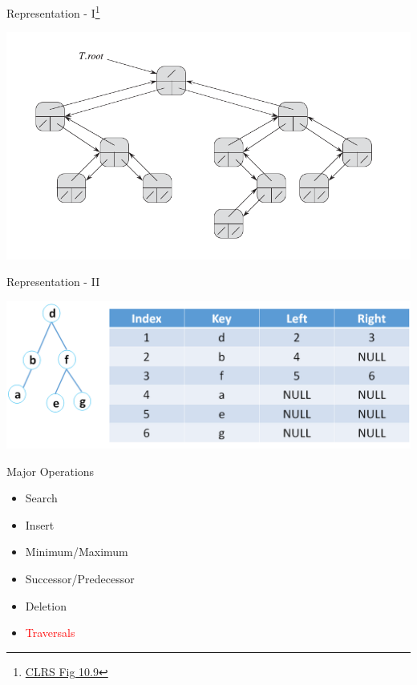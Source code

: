 \documentclass{beamer}
\newcommand{\hred}[1]{{\textcolor{red}{#1}}}
\newcommand{\furl}[1]{{\footnote{\url{#1}}}}
\begin{document}
\begin{frame}{Representation - I\furl{CLRS Fig 10.9}}
    \begin{center}
        \includegraphics[scale=0.4]{bstRepresentation1.png}
    \end{center}
\end{frame}


\begin{frame}{Representation - II}
    \begin{center}
        \includegraphics[scale=0.36]{bstRepresentation2.png}
    \end{center}
\end{frame}



\begin{frame}{Major Operations}
    \begin{itemize}
        \item Search
        \item Insert
        \item Minimum/Maximum
        \item Successor/Predecessor
        \item Deletion
        \item \hred{Traversals}
    \end{itemize}
\end{frame}
\end{document}
